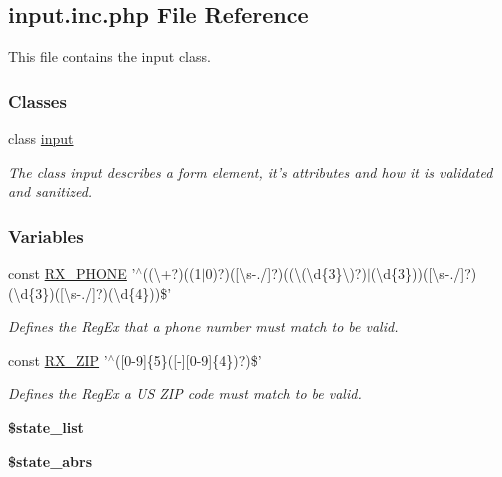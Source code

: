 \hypertarget{input_8inc_8php}{\subsection{input.\-inc.\-php File Reference}
\label{input_8inc_8php}
}


This file contains the input class.  


\subsubsection*{Classes}
\begin{DoxyCompactItemize}
\item 
class \hyperlink{classinput}{input}
\begin{DoxyCompactList}\small\item\em The class input describes a form element, it's attributes and how it is validated and sanitized. \end{DoxyCompactList}\end{DoxyCompactItemize}
\subsubsection*{Variables}
\begin{DoxyCompactItemize}
\item 
\hypertarget{input_8inc_8php_a28a895521a5452ff587c2433af17a5f6}{const \hyperlink{input_8inc_8php_a28a895521a5452ff587c2433af17a5f6}{R\-X\-\_\-\-P\-H\-O\-N\-E} '$^\wedge$((\textbackslash{}+?)((1$\vert$0)?)(\mbox{[}\textbackslash{}s-\/./\mbox{]}?)((\textbackslash{}(\textbackslash{}d\{3\}\textbackslash{})?)$\vert$(\textbackslash{}d\{3\}))(\mbox{[}\textbackslash{}s-\/./\mbox{]}?)(\textbackslash{}d\{3\})(\mbox{[}\textbackslash{}s-\/./\mbox{]}?)(\textbackslash{}d\{4\}))\$'}\label{input_8inc_8php_a28a895521a5452ff587c2433af17a5f6}

\begin{DoxyCompactList}\small\item\em Defines the Reg\-Ex that a phone number must match to be valid. \end{DoxyCompactList}\item 
\hypertarget{input_8inc_8php_a4dc6cafe7e22d63d07d3f9227d01fb07}{const \hyperlink{input_8inc_8php_a4dc6cafe7e22d63d07d3f9227d01fb07}{R\-X\-\_\-\-Z\-I\-P} '$^\wedge$(\mbox{[}0-\/9\mbox{]}\{5\}(\mbox{[}-\/\mbox{]}\mbox{[}0-\/9\mbox{]}\{4\})?)\$'}\label{input_8inc_8php_a4dc6cafe7e22d63d07d3f9227d01fb07}

\begin{DoxyCompactList}\small\item\em Defines the Reg\-Ex a U\-S Z\-I\-P code must match to be valid. \end{DoxyCompactList}\item 
\hypertarget{input_8inc_8php_a1709cc1293c85b37bd08c640d66e07cf}{{\bfseries \$state\-\_\-list}}\label{input_8inc_8php_a1709cc1293c85b37bd08c640d66e07cf}

\item 
{\bfseries \$state\-\_\-abrs}
\end{DoxyCompactItemize}



